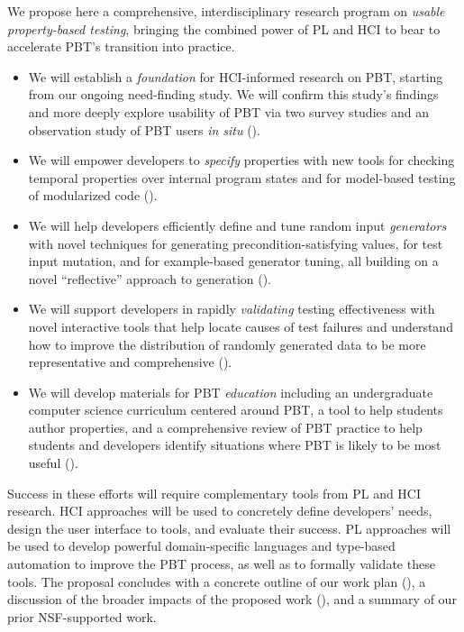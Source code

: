 We propose here a comprehensive, interdisciplinary research program on
\emph{usable
property-based testing}, bringing the combined power of PL and HCI to bear to
accelerate PBT's transition into practice.
\begin{itemize}[noitemsep]
\item We will establish a \emph{foundation} for HCI-informed research on PBT,
starting from our ongoing need-finding study. We will confirm
this study's findings and more deeply explore usability of PBT via
two survey studies and an observation study
of PBT users {\em in situ} ().
  \item We will empower developers to \emph{specify} properties with
  new tools for checking temporal properties over internal program states and
for model-based testing of modularized code ().
  \item We will help developers efficiently define and tune random input
\emph{generators} with novel techniques for generating precondition-satisfying
values, for test input mutation, and for example-based generator
tuning, all building
  on a novel ``reflective'' approach to generation ().
  \item We will support developers in rapidly \emph{validating} testing
  effectiveness with novel interactive tools that help
locate causes of test failures and understand how to improve the
distribution of randomly generated
data to be more representative and comprehensive
().
  \item We will develop materials for PBT \emph{education}
  including an undergraduate computer science curriculum centered around PBT, a
  tool to help students author properties, and a comprehensive review of PBT
  practice to help students and developers identify situations where
  PBT is likely to be most useful ().
\end{itemize}
%
Success in these efforts will require complementary tools from PL
and HCI research. HCI approaches will be used to concretely define developers' needs,
design the user interface to tools, and evaluate their success. PL approaches
will be used to develop powerful domain-specific languages and type-based automation
to improve the PBT process, as well as to formally validate these
tools. The proposal concludes with a concrete outline of our work plan
(), a discussion of the broader impacts of the
proposed work (), and a summary of our
prior NSF-supported work.

